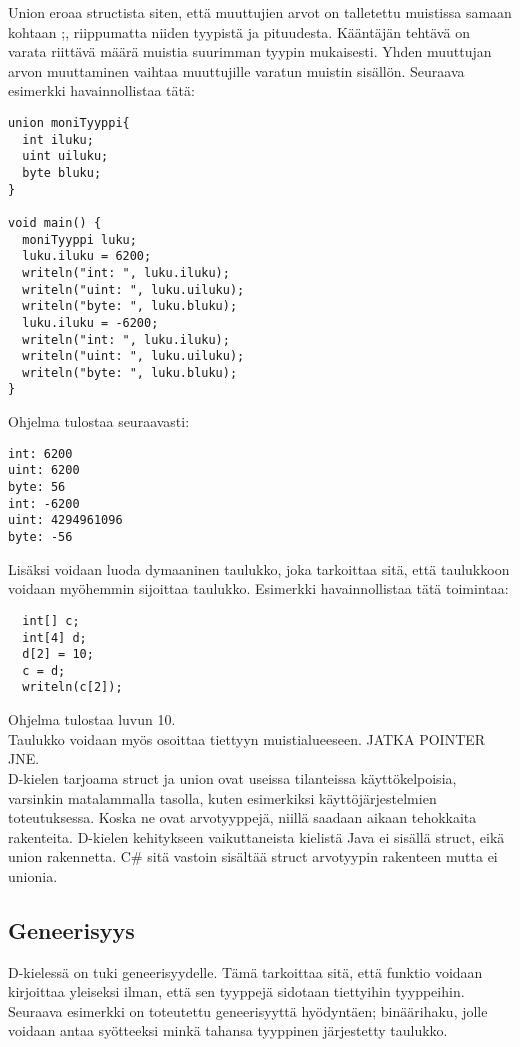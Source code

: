 \documentclass[11pt,oneside,a4paper]{article}
\begin{document}
Union eroaa structista siten, että muuttujien arvot on talletettu muistissa samaan kohtaan \cite{ALE10};\cite{KRR88}, riippumatta niiden tyypistä ja pituudesta. Kääntäjän tehtävä on varata riittävä määrä muistia suurimman tyypin mukaisesti. Yhden muuttujan arvon muuttaminen vaihtaa muuttujille varatun muistin sisällön. Seuraava esimerkki havainnollistaa tätä:
\begin{verbatim}
union moniTyyppi{
  int iluku;
  uint uiluku;
  byte bluku;
}

void main() {
  moniTyyppi luku;
  luku.iluku = 6200;
  writeln("int: ", luku.iluku);
  writeln("uint: ", luku.uiluku);
  writeln("byte: ", luku.bluku);
  luku.iluku = -6200;
  writeln("int: ", luku.iluku);
  writeln("uint: ", luku.uiluku);
  writeln("byte: ", luku.bluku);
}
\end{verbatim}
Ohjelma tulostaa seuraavasti:

\begin{verbatim}
int: 6200
uint: 6200
byte: 56
int: -6200
uint: 4294961096
byte: -56
\end{verbatim}

Lisäksi voidaan luoda dymaaninen taulukko, joka tarkoittaa sitä, että taulukkoon voidaan myöhemmin sijoittaa taulukko. Esimerkki havainnollistaa tätä toimintaa:

\begin{verbatim}
  int[] c;
  int[4] d;
  d[2] = 10;
  c = d;
  writeln(c[2]);
\end{verbatim}
Ohjelma tulostaa luvun 10. \\
Taulukko voidaan myös osoittaa tiettyyn muistialueeseen. JATKA POINTER JNE. \\


D-kielen tarjoama struct ja union ovat useissa tilanteissa käyttökelpoisia, varsinkin matalammalla tasolla, kuten esimerkiksi käyttöjärjestelmien toteutuksessa. Koska ne ovat arvotyyppejä, niillä saadaan aikaan tehokkaita rakenteita. D-kielen kehitykseen vaikuttaneista kielistä Java ei sisällä struct, eikä union rakennetta. C\# sitä vastoin sisältää struct arvotyypin rakenteen mutta ei unionia.

\subsection{Geneerisyys}
D-kielessä on tuki geneerisyydelle. Tämä tarkoittaa sitä, että funktio voidaan kirjoittaa yleiseksi ilman, että sen tyyppejä sidotaan tiettyihin tyyppeihin. Seuraava esimerkki on toteutettu geneerisyyttä hyödyntäen; binäärihaku, jolle voidaan antaa syötteeksi minkä tahansa tyyppinen järjestetty taulukko.
\end{document}
